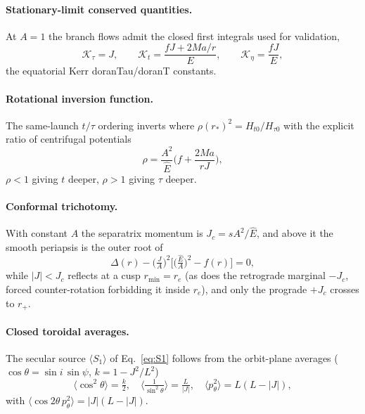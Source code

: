 \documentclass[
    aps, prd, twocolumn, superscriptaddress,
    showpacs, nofootinbib, floatfix
]{revtex4-2}
\newcommand{\Ehat}{\hat E}
\newcommand{\rp}{r_{+}}
\newcommand{\re}{r_{e}}
\newcommand{\Jc}{J_{c}}
\begin{document}
\paragraph{Stationary-limit conserved quantities.} At $A=1$ the branch flows admit
the closed first integrals used for validation,
\begin{equation}
    \mathcal K_\tau=J,\qquad
    \mathcal K_t=\frac{fJ+2Ma/r}{E},\qquad
    \mathcal K_\eta=\frac{fJ}{E},
    \label{eq:kerr-conserved}
\end{equation}
the equatorial Kerr doranTau/doranT constants.

\paragraph{Rotational inversion function.} The same-launch $t/\tau$ ordering
inverts where $\rho(r_*)^2=H_{t0}/H_{\tau0}$ with the explicit ratio of
centrifugal potentials
\begin{equation}
    \rho=\frac{A^2}{\Ehat}\Big(f+\frac{2Ma}{rJ}\Big),
    \label{eq:rho-explicit}
\end{equation}
$\rho<1$ giving $t$ deeper, $\rho>1$ giving $\tau$ deeper.

\paragraph{Conformal trichotomy.} With constant $A$ the separatrix momentum is
$\Jc=sA^2/\Ehat$, and above it the smooth periapsis is the outer root of
\begin{equation}
    \Delta(r)-\Big(\tfrac{J}{A}\Big)^2\Big[\big(\tfrac{\Ehat}{A}\big)^2-f(r)\Big]=0,
    \label{eq:periapsis-root}
\end{equation}
while $|J|<\Jc$ reflects at a cusp $r_{\min}=\re$ (as does the retrograde
marginal $-\Jc$, forced counter-rotation forbidding it inside $\re$), and only
the prograde $+\Jc$ crosses to $\rp$.

\paragraph{Closed toroidal averages.} The secular source $\langle S_1\rangle$ of
Eq.~\eqref{eq:S1} follows from the orbit-plane averages ($\cos\theta=\sin i\,
\sin\psi$, $k=1-J^2/L^2$)
\begin{equation}
    \Big\langle\cos^2\theta\Big\rangle=\tfrac{k}{2},\quad
    \Big\langle\tfrac{1}{\sin^2\theta}\Big\rangle=\tfrac{L}{|J|},\quad
    \big\langle p_\theta^2\big\rangle=L(L-|J|),
    \label{eq:averages}
\end{equation}
with $\langle\cos2\theta\,p_\theta^2\rangle=|J|(L-|J|)$.
\end{document}
